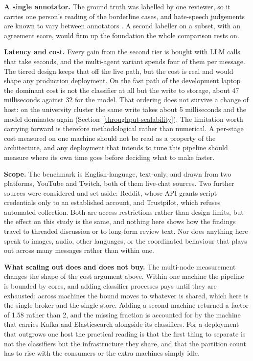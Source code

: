 \textbf{A single annotator.} The ground truth was labelled by one reviewer, so it carries one person's reading of the borderline cases, and hate-speech judgements are known to vary between annotators \citep{ross2017reliability, disagreerationales2026}. A second labeller on a subset, with an agreement score, would firm up the foundation the whole comparison rests on.

\textbf{Latency and cost.} Every gain from the second tier is bought with LLM calls that take seconds, and the multi-agent variant spends four of them per message. The tiered design keeps that off the live path, but the cost is real and would shape any production deployment. On the fast path of the development laptop the dominant cost is not the classifier at all but the write to storage, about 47 milliseconds against 32 for the model. That ordering does not survive a change of host: on the university cluster the same write takes about 5 milliseconds and the model dominates again (Section~\ref{throughput-scalability}). The limitation worth carrying forward is therefore methodological rather than numerical. A per-stage cost measured on one machine should not be read as a property of the architecture, and any deployment that intends to tune this pipeline should measure where its own time goes before deciding what to make faster.

\textbf{Scope.} The benchmark is English-language, text-only, and drawn from two platforms, YouTube and Twitch, both of them live-chat sources. Two further sources were considered and set aside: Reddit, whose API grants script credentials only to an established account, and Trustpilot, which refuses automated collection. Both are access restrictions rather than design limits, but the effect on this study is the same, and nothing here shows how the findings travel to threaded discussion or to long-form review text. Nor does anything here speak to images, audio, other languages, or the coordinated behaviour that plays out across many messages rather than within one.

\textbf{What scaling out does and does not buy.} The multi-node measurement changes the shape of the cost argument above. Within one machine the pipeline is bounded by cores, and adding classifier processes pays until they are exhausted; across machines the bound moves to whatever is shared, which here is the single broker and the single store. Adding a second machine returned a factor of 1.58 rather than 2, and the missing fraction is accounted for by the machine that carries Kafka and Elasticsearch alongside its classifiers. For a deployment that outgrows one host the practical reading is that the first thing to separate is not the classifiers but the infrastructure they share, and that the partition count has to rise with the consumers or the extra machines simply idle.

